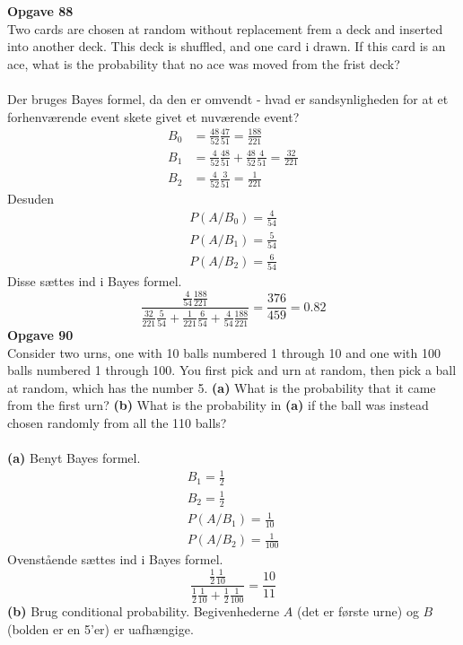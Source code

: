 \documentclass[12pt,a4paper,draft]{report}
\begin{document}
\textbf{Opgave 88}\\
Two cards are chosen at random without replacement frem a deck and inserted into another deck. This deck is shuffled, and one card i drawn. If this card is an ace, what is the probability that no ace was moved from the frist deck?\\\\
Der bruges Bayes formel, da den er omvendt - hvad er sandsynligheden for at et forhenværende event skete givet et nuværende event?
\begin{align*}
B_0&=\frac{48}{52}\frac{47}{51}=\frac{188}{221}\\
B_1&=\frac{4}{52}\frac{48}{51}+\frac{48}{52}\frac{4}{51}=\frac{32}{221}\\
B_2&=\frac{4}{52}\frac{3}{51}=\frac{1}{221}
\end{align*}
Desuden
\begin{align*}
P(A/B_0)=\frac{4}{54}\\
P(A/B_1)=\frac{5}{54}\\
P(A/B_2)=\frac{6}{54}
\end{align*}
Disse sættes ind i Bayes formel.
\begin{equation}
\frac{\frac{4}{54}\frac{188}{221}}{\frac{32}{221}\frac{5}{54}+\frac{1}{221}\frac{6}{54}+\frac{4}{54}\frac{188}{221}}=\frac{376}{459}=0.82
\end{equation}
\textbf{Opgave 90}\\
Consider two urns, one with 10 balls numbered 1 through 10 and one with 100 balls numbered 1 through 100. You first pick and urn at random, then pick a ball at random, which has the number 5. \textbf{(a)} What is the probability that it came from the first urn? \textbf{(b)} What is the probability in \textbf{(a)} if the ball was instead chosen randomly from all the 110 balls?\\\\
\textbf{(a)} Benyt Bayes formel.
\begin{align*}
B_1=\frac{1}{2}\\
B_2=\frac{1}{2}\\
P(A/B_1)=\frac{1}{10}\\
P(A/B_2)=\frac{1}{100}
\end{align*}
Ovenstående sættes ind i Bayes formel.
\begin{equation}
\frac{\frac{1}{2}\frac{1}{10}}
{\frac{1}{2}\frac{1}{10}+\frac{1}{2}\frac{1}{100}}
=\frac{10}{11}
\end{equation}
\textbf{(b)} Brug conditional probability. Begivenhederne $A$ (det er første urne) og $B$ (bolden er en 5'er) er uafhængige.
\end{document}
